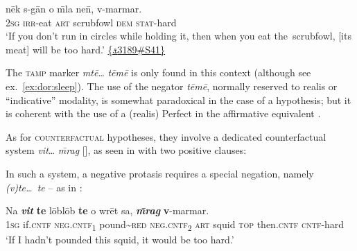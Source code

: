 \documentclass[output=paper,colorlinks,citecolor=brown,draft]{langscibook}
\begin{document}
    \gll   nēk s-gān o \={m}la ne\={n}, v-marmar.\\
    \textsc{2sg} \textsc{irr}-eat \textsc{art} scrubfowl \textsc{dem} \textsc{stat}-hard \\
     ‘If you don’t run in circles while holding it, then when you eat the~scrubfowl, [its meat] will be too hard.’ \quad \href{https://doi.org/10.24397/pangloss-0003189#S41}{\{\texttt{⚓}3189\#S41\}}
\z 

The \textsc{tamp} marker \textit{mtē}… \textit{tēmē} is only found in this context (although see ex.~\ref{ex:dor:sleep}). The use of the negator \textit{tēmē}, normally reserved to realis or “indicative” modality, is somewhat paradoxical in the case of a hypothesis; but it is coherent with the use of a (realis) Perfect in the affirmative equivalent .

As for \textsc{counterfactual} hypotheses, they involve a dedicated counterfactual system \textit{vit}… \textit{\={m}rag} [], as seen in  with two positive clauses:



In such a system, a negative protasis requires a special negation, namely \textit{(v)te…~te} -- as in :

\ea
    \label{ex:dor:squid}
    \gll Na \textbf{\textit{vit}} \textbf{te} lōblōb \textbf{te} o wrēt sa, \textbf{\textit{\={m}rag}} \textbf{v}-marmar.\\
        \textsc{1sg} if.\textsc{cntf} \textsc{neg.cntf\textsubscript{1}} pound{\textasciitilde}\textsc{red} \textsc{neg.cntf\textsubscript{2}} \textsc{art} squid \textsc{top} then.\textsc{cntf} \textsc{cntf-}hard \\
    \glt ‘If I hadn’t pounded this squid, it would be too hard.’ \quad {\small [\textsc{af.bp3}.33a]}
\z 
\end{document}
